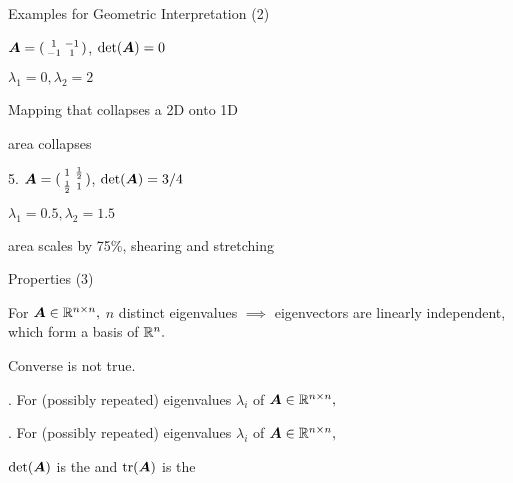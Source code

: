 \documentclass[handout,fleqn,aspectratio=169]{beamer}
\begin{document}
\begin{frame}{Examples for Geometric Interpretation (2)}

\plitemsep 0.03in
\bigskip
{}
{
\small
\bce[4.]
\item $\bm{A} = 
(\begin{smallmatrix}
1 & -1 \cr
-1 & 1
\end{smallmatrix})$, $\det(\bm{A}) = 0$ 

\bci
\item $\lambda_1 = 0, \lambda_2 = 2$
\item Mapping that collapses a 2D onto 1D
\item area collapses
\eci

\bigskip
\item[5.] $\bm{A} = 
(\begin{smallmatrix}
1 & \frac{1}{2} \cr
\frac{1}{2} & 1
\end{smallmatrix})$, $\det(\bm{A}) = 3/4$
\bci
\item $\lambda_1 = 0.5, \lambda_2 = 1.5$
\item area scales by 75\%, shearing and stretching
\eci
\ece
}
{
\vspace{-0.5cm}
\centering
{}

\vspace{0.5cm}

}

\end{frame}


\begin{frame}{Properties (3)}

\plitemsep 0.05in

\bci
\item For $\bm{A} \in {\mathbb R}^{n \times n},$ $n$ distinct eigenvalues $\implies$ eigenvectors are linearly independent, which form a basis of ${\mathbb R}^n.$
 \bci
 \item Converse is not true.
 \item {} 
 \eci

\item {}. For (possibly repeated) eigenvalues $\lambda_i$ of $\bm{A} \in {\mathbb R}^{n \times n},$ 
\item {}. For (possibly repeated) eigenvalues $\lambda_i$ of $\bm{A} \in {\mathbb R}^{n \times n},$ 
\item \msg $\det(\bm{A})$ is the  and $\operatorname{tr}(\bm{A})$ is the 

\eci
\end{frame}
\end{document}
